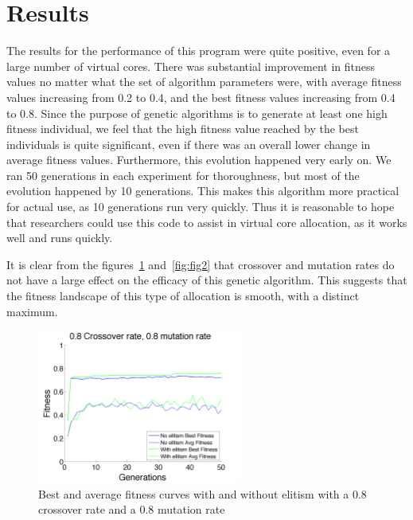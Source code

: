 \documentclass[11pt]{article}
\begin{document}
\section{Results}

The results for the performance of this program were quite positive, even for a large number of virtual cores. There was substantial improvement in fitness values no matter what the set of algorithm parameters were, with average fitness values increasing from 0.2 to 0.4, and the best fitness values increasing from 0.4 to 0.8. Since the purpose of genetic algorithms is to generate at least one high fitness individual, we feel that the high fitness value reached by the best individuals is quite significant, even if there was an overall lower change in average fitness values. Furthermore, this evolution happened very early on. We ran 50 generations in each experiment for thoroughness, but most of the evolution happened by 10 generations. This makes this algorithm more practical for actual use, as 10 generations run very quickly. Thus it is reasonable to hope that researchers could use this code to assist in virtual core allocation, as it works well and runs quickly. 

It is clear from the figures~\ref{fig:fig1} and~\ref{fig:fig2} that crossover and mutation rates do not have a large effect on the efficacy of this genetic algorithm. This suggests that the fitness landscape of this type of allocation is smooth, with a distinct maximum. 

\begin{figure}[H]
 \centering
  \includegraphics[width=0.6\textwidth,height=0.2\textheight]{figures/fitness08mut08cross.png}
  \caption{Best and average fitness curves with and without elitism with a 0.8 crossover rate and a 0.8 mutation rate}
  \label{fig:fig1}  
\end{figure} 
\end{document}
